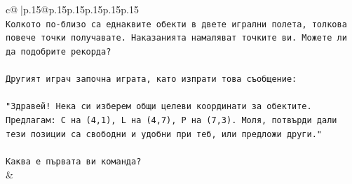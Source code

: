 \documentclass{article}
\begin{document}
{\begin{supertabular}{c@{$\;$}|p{.15\linewidth}@{}p{.15\linewidth}p{.15\linewidth}p{.15\linewidth}p{.15\linewidth}p{.15\linewidth}}
{{{\\ 
\texttt{Колкото по{-}близо са еднаквите обекти в двете игрални полета, толкова повече точки получавате. Наказанията намаляват точките ви. Можете ли да подобрите рекорда?} \\
\\ 
\texttt{Другият играч започна играта, като изпрати това съобщение:} \\
\\ 
\texttt{"Здравей! Нека си изберем общи целеви координати за обектите. Предлагам: C на (4,1), L на (4,7), P на (7,3). Моля, потвърди дали тези позиции са свободни и удобни при теб, или предложи други."} \\
\\ 
\texttt{Каква е първата ви команда?} \\
            }
        }
    }
    & \\ \\


\end{supertabular}}
\end{document}
